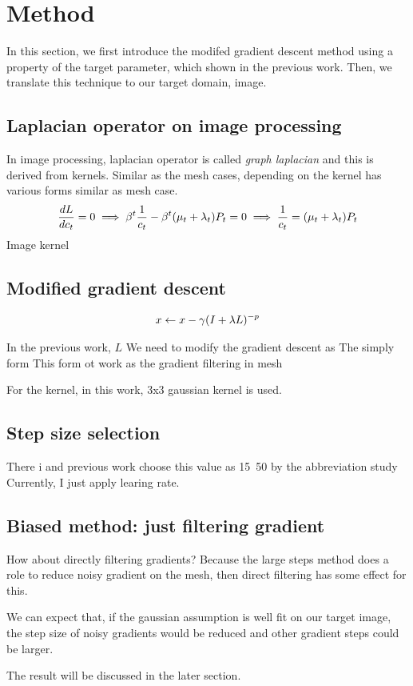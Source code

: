 \section*{Method}\label{ch:ch3label}

In this section, we first introduce the modifed gradient descent method using a property of the target parameter, which shown in the previous work\cite{Nicolet2021Large}. Then, we translate this technique to our target domain, image.

\subsection*{Laplacian operator on image processing}
In image processing, laplacian operator is called \emph{graph laplacian} and this is derived from kernels. Similar as the mesh cases, depending on the kernel has various forms similar as mesh case.
\begin{align}{\label{eq2}}
	\frac{dL}{dc_t} = 0 \implies \beta^t\frac{1}{c_t}-\beta^t(\mu_t+\lambda_t)P_t=0 \implies \frac{1}{c_t}=(\mu_t+\lambda_t)P_t
\end{align}
Image kernel

\subsection*{Modified gradient descent}
\begin{align}{\label{eq1}}
	x \leftarrow x - \gamma (I + \lambda L)^{-p} 
\end{align}

In the previous work\cite{Nicolet2021Large}, $L$ 
We need to modify the gradient descent as
The simply form
This form ot 
work as the gradient filtering in mesh

For the kernel, in this work, 3x3 gaussian kernel is used.

\subsection*{Step size selection}
There i and previous work choose this value as 15~50 by the abbreviation study
Currently, I just apply learing rate.

\subsection*{Biased method: just filtering gradient}

How about directly filtering gradients? Because the large steps method does a role to reduce noisy gradient on the mesh, then direct filtering has some effect for this.

We can expect that, if the gaussian assumption is well fit on our target image, the step size of noisy gradients would be reduced and other gradient steps could be larger.

The result will be discussed in the later section.

